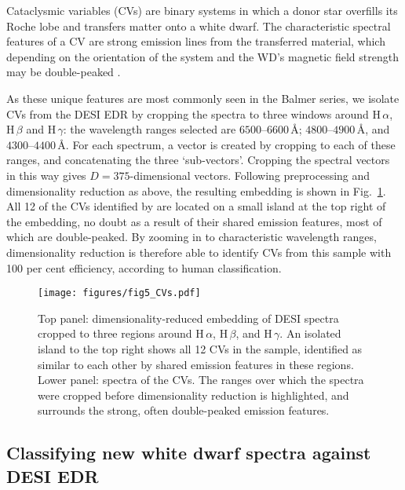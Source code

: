 \documentclass[fleqn,usenatbib]{mnras}
\begin{document}
Cataclysmic variables (CVs) are binary systems in which a donor star overfills its Roche lobe and transfers matter onto a white dwarf.
The characteristic spectral features of a CV are strong emission lines from the transferred material, which depending on the orientation of the system and the WD's magnetic field strength may be double-peaked \citep{smak69, huang72}.

As these unique features are most commonly seen in the Balmer series, we isolate CVs from the DESI EDR by cropping the spectra to three windows around H$\,\alpha$, H$\,\beta$ and H$\,\gamma$:
the wavelength ranges selected are $6500$--$6600\,\text{\AA}$; $4800$--$4900\,\text{\AA}$, and $4300$--$4400\,\text{\AA}$.
For each spectrum, a vector is created by cropping to each of these ranges, and concatenating the three `sub-vectors'.
Cropping the spectral vectors in this way gives $D=375$-dimensional vectors.
Following preprocessing and dimensionality reduction as above, the resulting embedding is shown in Fig.~\ref{fig:CVs}.
All 12 of the CVs identified by \citet{manser24} are located on a small island at the top right of the embedding, no doubt as a result of their shared emission features, most of which are double-peaked.
By zooming in to characteristic wavelength ranges, dimensionality reduction is therefore able to identify CVs from this sample with 100 per cent efficiency, according to human classification.

\begin{figure}
\centering
\texttt{[image: figures/fig5\_CVs.pdf]}
\caption{
    Top panel: dimensionality-reduced embedding of DESI spectra cropped to three regions around H\,$\alpha$, H\,$\beta$, and H\,$\gamma$.
    An isolated island to the top right shows all 12 CVs in the sample, identified as similar to each other by shared emission features in these regions.
    Lower panel: spectra of the CVs.
    The ranges over which the spectra were cropped before dimensionality reduction is highlighted, and surrounds the strong, often double-peaked emission features.
}
\label{fig:CVs}
\end{figure}


\subsection{Classifying new white dwarf spectra against DESI EDR}
\end{document}
